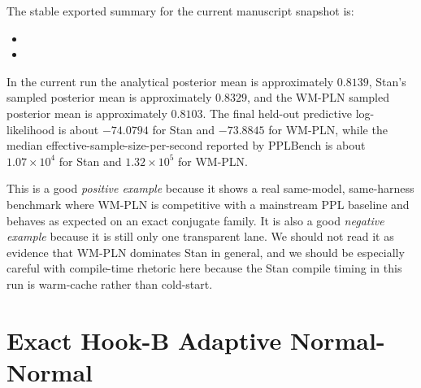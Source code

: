 \documentclass[11pt,openany]{report}
\begin{document}
The stable exported summary for the current manuscript snapshot is:
\begin{itemize}
\item {}
\item {}
\end{itemize}

\begin{table}[htbp]
\centering
\caption{Direct Normal-Normal comparison on the proper PPLBench
surface. On this exact conjugate case, the refreshed WM-PLN lane is slightly
closer to the analytical posterior mean and slightly better on held-out
predictive log-likelihood in the recorded run.}
\label{tab:pplbench-stan-vs-pln}
\end{table}

In the current run the analytical posterior mean is approximately
$0.8139$, Stan's sampled posterior mean is approximately $0.8329$, and the
WM-PLN sampled posterior mean is approximately $0.8103$.  The final held-out
predictive log-likelihood is about $-74.0794$ for Stan and $-73.8845$ for
WM-PLN, while the median effective-sample-size-per-second reported by
PPLBench is about $1.07\times 10^4$ for Stan and $1.32\times 10^5$ for
WM-PLN.

This is a good \emph{positive example} because it shows a real same-model,
same-harness benchmark where WM-PLN is competitive with a mainstream PPL
baseline and behaves as expected on an exact conjugate family.  It is also
a good \emph{negative example} because it is still only one transparent lane.
We should not read it as evidence that WM-PLN dominates Stan in general, and
we should be especially careful with compile-time rhetoric here because the
Stan compile timing in this run is warm-cache rather than cold-start.

\section{Exact Hook-B Adaptive Normal-Normal}
\label{app:pplbench-hookb-normal}
\end{document}
